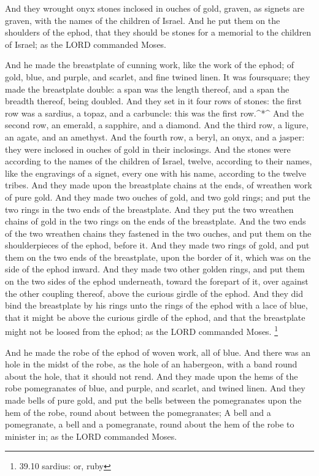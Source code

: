  And they wrought onyx stones inclosed in ouches of gold,
graven, as signets are graven, with the names of the children of Israel.
 And he put them on the shoulders of the ephod, that they
should be stones for a memorial to the children of Israel; as the LORD
commanded Moses.

 And he made the breastplate of cunning work, like the work
of the ephod; of gold, blue, and purple, and scarlet, and fine twined
linen.  It was foursquare; they made the breastplate double:
a span was the length thereof, and a span the breadth thereof, being
doubled.  And they set in it four rows of stones: the first
row was a sardius, a topaz, and a carbuncle: this was the first
row.\^{}*\^{}  And the second row, an emerald, a sapphire,
and a diamond.  And the third row, a ligure, an agate, and
an amethyst.  And the fourth row, a beryl, an onyx, and a
jasper: they were inclosed in ouches of gold in their inclosings.
 And the stones were according to the names of the children
of Israel, twelve, according to their names, like the engravings of a
signet, every one with his name, according to the twelve tribes.
 And they made upon the breastplate chains at the ends, of
wreathen work of pure gold.  And they made two ouches of
gold, and two gold rings; and put the two rings in the two ends of the
breastplate.  And they put the two wreathen chains of gold
in the two rings on the ends of the breastplate.  And the
two ends of the two wreathen chains they fastened in the two ouches, and
put them on the shoulderpieces of the ephod, before it. 
And they made two rings of gold, and put them on the two ends of the
breastplate, upon the border of it, which was on the side of the ephod
inward.  And they made two other golden rings, and put them
on the two sides of the ephod underneath, toward the forepart of it,
over against the other coupling thereof, above the curious girdle of the
ephod.  And they did bind the breastplate by his rings unto
the rings of the ephod with a lace of blue, that it might be above the
curious girdle of the ephod, and that the breastplate might not be
loosed from the ephod; as the LORD commanded Moses. \footnote{39.10
  sardius: or, ruby}

 And he made the robe of the ephod of woven work, all of
blue.  And there was an hole in the midst of the robe, as
the hole of an habergeon, with a band round about the hole, that it
should not rend.  And they made upon the hems of the robe
pomegranates of blue, and purple, and scarlet, and twined linen.
 And they made bells of pure gold, and put the bells
between the pomegranates upon the hem of the robe, round about between
the pomegranates;  A bell and a pomegranate, a bell and a
pomegranate, round about the hem of the robe to minister in; as the LORD
commanded Moses.

